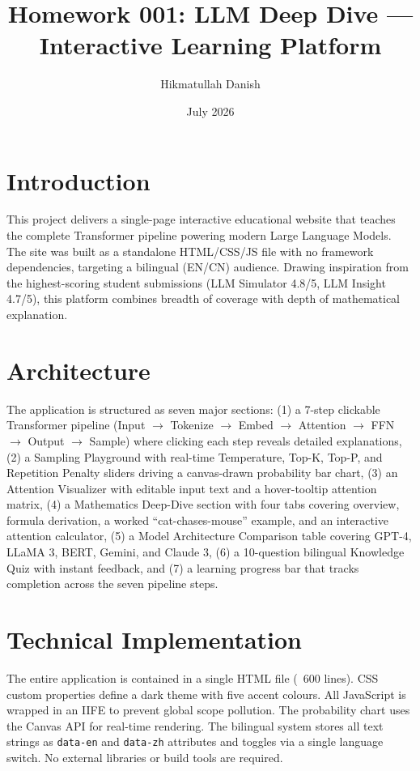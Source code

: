\documentclass[12pt,a4paper]{article}
\title{Homework 001: LLM Deep Dive — Interactive Learning Platform}
\author{Hikmatullah Danish \quad 3125999089}
\date{July 2026}
\begin{document}
\maketitle

\section{Introduction}
This project delivers a single-page interactive educational website that teaches the complete Transformer pipeline powering modern Large Language Models. The site was built as a standalone HTML/CSS/JS file with no framework dependencies, targeting a bilingual (EN/CN) audience. Drawing inspiration from the highest-scoring student submissions (LLM Simulator 4.8/5, LLM Insight 4.7/5), this platform combines breadth of coverage with depth of mathematical explanation.

\section{Architecture}
The application is structured as seven major sections: (1) a 7-step clickable Transformer pipeline (Input $\rightarrow$ Tokenize $\rightarrow$ Embed $\rightarrow$ Attention $\rightarrow$ FFN $\rightarrow$ Output $\rightarrow$ Sample) where clicking each step reveals detailed explanations, (2) a Sampling Playground with real-time Temperature, Top-K, Top-P, and Repetition Penalty sliders driving a canvas-drawn probability bar chart, (3) an Attention Visualizer with editable input text and a hover-tooltip attention matrix, (4) a Mathematics Deep-Dive section with four tabs covering overview, formula derivation, a worked ``cat-chases-mouse'' example, and an interactive attention calculator, (5) a Model Architecture Comparison table covering GPT-4, LLaMA 3, BERT, Gemini, and Claude 3, (6) a 10-question bilingual Knowledge Quiz with instant feedback, and (7) a learning progress bar that tracks completion across the seven pipeline steps.

\section{Technical Implementation}
The entire application is contained in a single HTML file (~600 lines). CSS custom properties define a dark theme with five accent colours. All JavaScript is wrapped in an IIFE to prevent global scope pollution. The probability chart uses the Canvas API for real-time rendering. The bilingual system stores all text strings as \texttt{data-en} and \texttt{data-zh} attributes and toggles via a single language switch. No external libraries or build tools are required.
\end{document}
